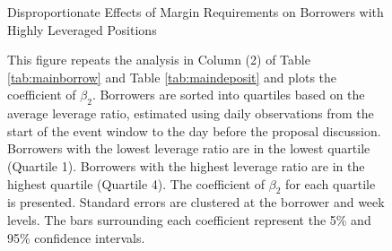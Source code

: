 \begin{landscape}
\begin{figure}[ht!]
\centering
\caption{Disproportionate Effects of Margin Requirements on Borrowers with Highly
Leveraged Positions}\label{fig:loandeposit_highlev}
\caption*{This figure repeats the analysis in Column (2) of Table \ref{tab:mainborrow} and Table \ref{tab:maindeposit} and plots the coefficient of $\beta_2$. Borrowers are sorted into quartiles based on the average leverage ratio, estimated using daily observations from the start of the event window to the day before the proposal discussion. Borrowers with the lowest leverage ratio are in the lowest quartile (Quartile 1). Borrowers with the highest leverage ratio are in the highest quartile (Quartile 4). The coefficient of $\beta_2$ for each quartile is presented. Standard errors are clustered at the borrower and week levels. The bars surrounding each coefficient represent the 5\% and 95\% confidence intervals. }

\bigskip

\end{figure}

\end{landscape}

\clearpage
\newpage



